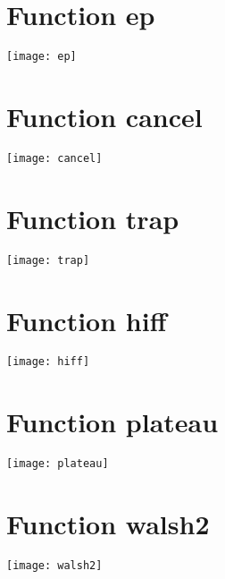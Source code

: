\section{Function ep}

\begin{center}
\texttt{[image: ep]}
\end{center}

\section{Function cancel}

\begin{center}
\texttt{[image: cancel]}
\end{center}

\section{Function trap}

\begin{center}
\texttt{[image: trap]}
\end{center}

\section{Function hiff}

\begin{center}
\texttt{[image: hiff]}
\end{center}

\section{Function plateau}

\begin{center}
\texttt{[image: plateau]}
\end{center}

\section{Function walsh2}

\begin{center}
\texttt{[image: walsh2]}
\end{center}

